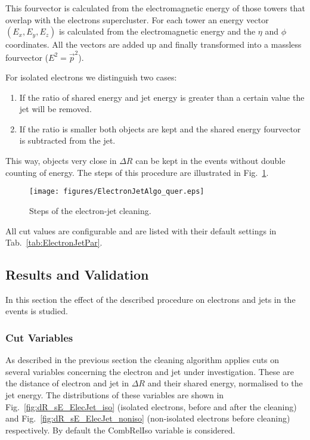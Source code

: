 \documentclass{cmspaper}
\begin{document}
This fourvector is calculated from the electromagnetic energy of those towers
that overlap with the electrons supercluster. For each
tower an energy vector $(E_x, E_y, E_z)$ is calculated from the electromagnetic
energy and the $\eta$ and $\phi$ coordinates. All the vectors are added
up and finally transformed into a massless fourvector ($E^2=\vec{p}^2$).

For isolated electrons we distinguish two cases:
\begin{enumerate}
\item If the ratio of shared energy and jet energy is greater than a certain
value the jet will be removed. 
\item If the ratio is smaller both objects are kept and the shared energy
fourvector is subtracted from the jet. 
\end{enumerate}
This way, objects very close in $\Delta R$ can be kept
in the events without double counting of energy.  The steps of this procedure
are illustrated in Fig.~\ref{fig:EJCleaning}.

\begin{figure}[hbt]
  \begin{center}
    \texttt{[image: figures/ElectronJetAlgo\_quer.eps]}
    \caption{Steps of the electron-jet cleaning.}
    \label{fig:EJCleaning}
  \end{center}
\end{figure}

All cut values are configurable and are listed with their default settings in
Tab.~\ref{tab:ElectronJetPar}.

\subsection{Results and Validation}
In this section the effect of the described procedure on electrons and jets in
the events is studied. 

\subsubsection{Cut Variables}
As described in the previous section the cleaning algorithm applies cuts on
several variables concerning the electron and jet under investigation. These are
the distance of electron and jet in $\Delta R$ and their shared energy,
normalised to the jet energy. The distributions of these variables are shown
in Fig.~\ref{fig:dR_sE_ElecJet_iso} (isolated electrons, before and after the
cleaning) and Fig.~\ref{fig:dR_sE_ElecJet_noniso} (non-isolated electrons
before cleaning) respectively. By default the CombRelIso variable is considered.
\end{document}
